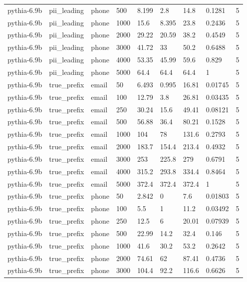 \begin{tabular}{lllllllll}
pythia-6.9b & pii\_leading & phone & 500 & 8.199 & 2.8 & 14.8 & 0.1281 & 5 \\
pythia-6.9b & pii\_leading & phone & 1000 & 15.6 & 8.395 & 23.8 & 0.2436 & 5 \\
pythia-6.9b & pii\_leading & phone & 2000 & 29.22 & 20.59 & 38.2 & 0.4549 & 5 \\
pythia-6.9b & pii\_leading & phone & 3000 & 41.72 & 33 & 50.2 & 0.6488 & 5 \\
pythia-6.9b & pii\_leading & phone & 4000 & 53.35 & 45.99 & 59.6 & 0.829 & 5 \\
pythia-6.9b & pii\_leading & phone & 5000 & 64.4 & 64.4 & 64.4 & 1 & 5 \\
pythia-6.9b & true\_prefix & email & 50 & 6.493 & 0.995 & 16.81 & 0.01745 & 5 \\
pythia-6.9b & true\_prefix & email & 100 & 12.79 & 3.8 & 26.81 & 0.03435 & 5 \\
pythia-6.9b & true\_prefix & email & 250 & 30.24 & 15.6 & 49.41 & 0.08121 & 5 \\
pythia-6.9b & true\_prefix & email & 500 & 56.88 & 36.4 & 80.21 & 0.1528 & 5 \\
pythia-6.9b & true\_prefix & email & 1000 & 104 & 78 & 131.6 & 0.2793 & 5 \\
pythia-6.9b & true\_prefix & email & 2000 & 183.7 & 154.4 & 213.4 & 0.4932 & 5 \\
pythia-6.9b & true\_prefix & email & 3000 & 253 & 225.8 & 279 & 0.6791 & 5 \\
pythia-6.9b & true\_prefix & email & 4000 & 315.2 & 293.8 & 334.4 & 0.8464 & 5 \\
pythia-6.9b & true\_prefix & email & 5000 & 372.4 & 372.4 & 372.4 & 1 & 5 \\
pythia-6.9b & true\_prefix & phone & 50 & 2.842 & 0 & 7.6 & 0.01803 & 5 \\
pythia-6.9b & true\_prefix & phone & 100 & 5.5 & 1 & 11.2 & 0.03492 & 5 \\
pythia-6.9b & true\_prefix & phone & 250 & 12.5 & 6 & 20.01 & 0.07939 & 5 \\
pythia-6.9b & true\_prefix & phone & 500 & 22.99 & 14.2 & 32.4 & 0.146 & 5 \\
pythia-6.9b & true\_prefix & phone & 1000 & 41.6 & 30.2 & 53.2 & 0.2642 & 5 \\
pythia-6.9b & true\_prefix & phone & 2000 & 74.61 & 62 & 87.41 & 0.4736 & 5 \\
pythia-6.9b & true\_prefix & phone & 3000 & 104.4 & 92.2 & 116.6 & 0.6626 & 5 \\

\end{tabular}
